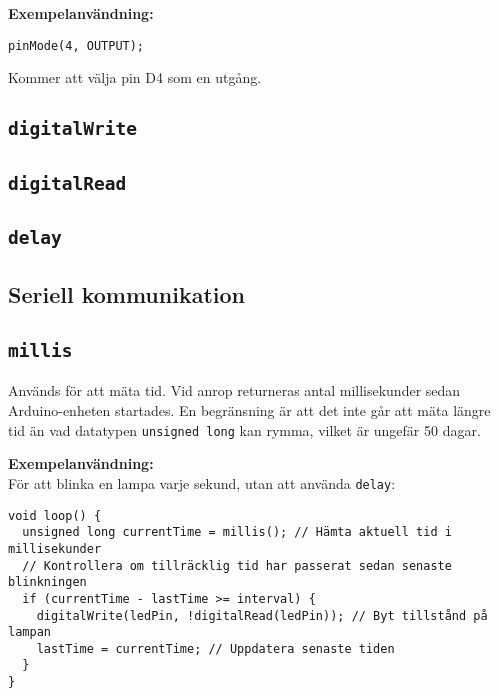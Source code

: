 \documentclass[11pt]{article}
\begin{document}
\textbf{Exempelanvändning:}
\begin{lstlisting}
pinMode(4, OUTPUT);
\end{lstlisting}
Kommer att välja pin D4 som en utgång.

\subsection{\texttt{digitalWrite}}

\subsection{\texttt{digitalRead}}

\subsection{\texttt{delay}}

\subsection{Seriell kommunikation}

\subsection{\texttt{millis}}
Används för att mäta tid. Vid anrop returneras antal millisekunder sedan Arduino-enheten startades. En begränsning är att det inte går att mäta längre tid än vad datatypen \texttt{unsigned long} kan rymma, vilket är ungefär 50 dagar.

\textbf{Exempelanvändning:}\\
För att blinka en lampa varje sekund, utan att använda \texttt{delay}:
\begin{lstlisting}
void loop() {
  unsigned long currentTime = millis(); // Hämta aktuell tid i millisekunder
  // Kontrollera om tillräcklig tid har passerat sedan senaste blinkningen
  if (currentTime - lastTime >= interval) {
    digitalWrite(ledPin, !digitalRead(ledPin)); // Byt tillstånd på lampan
    lastTime = currentTime; // Uppdatera senaste tiden
  }
}
\end{lstlisting}
\end{document}
